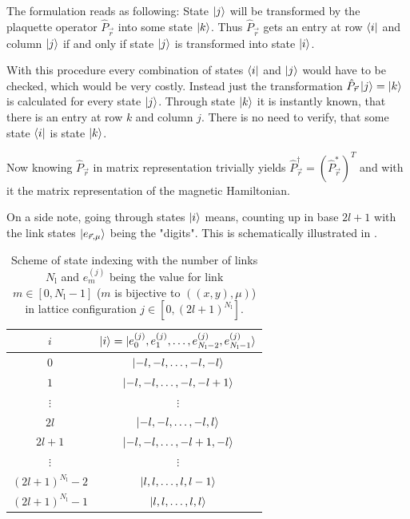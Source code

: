 The formulation reads as following: State $\ket{j}$ will be transformed by the plaquette operator $\hat{P}_{\vec{r}}$ into some state $\ket{k}$. Thus $\hat{P}_{\vec{r}}$ gets an entry at row $\bra{i}$ and column $\ket{j}$ if and only if state $\ket{j}$ is transformed into state $\ket{i}$.

With this procedure every combination of states $\bra{i}$ and $\ket{j}$ would have to be checked, which would be very costly. Instead just the transformation $\hat{P}_{\vec{r}}\ket{j}=\ket{k}$ is calculated for every state $\ket{j}$. Through state $\ket{k}$ it is instantly known, that there is an entry at row $k$ and column $j$. There is no need to verify, that some state $\bra{i}$ is state $\ket{k}$.

Now knowing $\hat{P}_{\vec{r}}$ in matrix representation trivially yields $\hat{P}_{\vec{r}}^{\dag}=\left(\hat{P}_{\vec{r}}^{*}\right)^{T}$ and with it the matrix representation of the magnetic Hamiltonian.

On a side note, going through states $\ket{i}$ means, counting up in base $2l+1$ with the link states $\ket{e_{\vec{r}, \mu}}$ being the "digits". This is schematically illustrated in .

\begin{table}[h]
	\begin{tabular}{c|c}
		$i$                       & $\ket{i}=\ket{e_{0}^{(j)}, e_{1}^{(j)}, \dots, e_{N_{\text{l}}-2}^{(j)}, e_{N_{\text{l}}-1}^{(j)}}$ \\
		\hline
		$0$                       & $\ket{-l,-l,\dots, -l,-l}$                                                                          \\
		$1$                       & $\ket{-l,-l,\dots,-l,-l+1}$                                                                         \\
		$\vdots$                  & $\vdots$                                                                                            \\
		$2l$                      & $\ket{-l,-l,\dots,-l,l}$                                                                            \\
		$2l+1$                    & $\ket{-l,-l,\dots,-l+1,-l}$                                                                         \\
		$\vdots$                  & $\vdots$                                                                                            \\
		$(2l+1)^{N_{\text{l}}}-2$ & $\ket{l,l,\dots,l,l-1}$                                                                             \\
		$(2l+1)^{N_{\text{l}}}-1$ & $\ket{l,l,\dots,l,l}$
	\end{tabular}
	\caption{Scheme of state indexing with the number of links $N_{\text{l}}$ and $e_{m}^{(j)}$ being the value for link $m\in[0, N_{\text{l}}-1]$ ($m$ is bijective to $((x, y), \mu)$) in lattice configuration $j\in[0,(2l+1)^{N_{\text{l}}}]$.}\label{tab:steidx}
\end{table}

